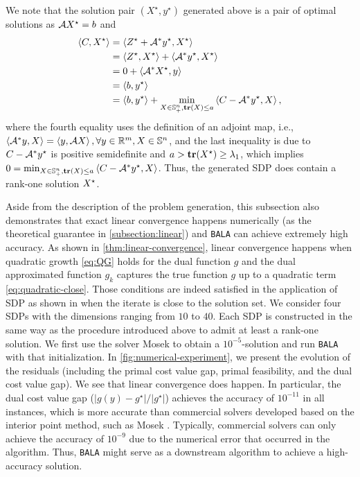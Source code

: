\documentclass[11pt]{article}
\newcommand{\alg}{\texttt{BALA}}%
\begin{document}
We note that the solution pair \( (X^\star, y^\star) \) generated above is a pair of optimal solutions as $\mathcal{A} X^\star = b$ and 
\begin{align*}
    \left \langle C, X^\star \right\rangle & = \left \langle Z^\star + \mathcal{A}^*y^\star, X^\star \right\rangle  \\
    & = \left \langle Z^\star, X^\star \right\rangle + \left \langle \mathcal{A}^*y^\star, X^\star \right\rangle \\
    & = 0 + \left \langle \mathcal{A}^* X^\star,  y \right\rangle \\
    & = \left \langle b, y^\star \right\rangle\\
    &=  \left \langle b, y^\star \right\rangle + \min_{X \in \mathbb{S}^n_+, \mathop{\bf tr}(X) \leq a} \left \langle C-\mathcal{A}^* y^\star, X \right\rangle,
\end{align*}
where the fourth equality uses the definition of an adjoint map, i.e., $\left \langle \mathcal{A}^* y,  X \right\rangle = \left \langle y, \mathcal{A} X \right\rangle, \forall y \in \mathbb{R}^m, X \in \mathbb{S}^n$, and the last inequality is due to $C - \mathcal{A}^* y^\star $ is positive semidefinite and $a > \mathop{\bf tr}(X^\star) \geq \lambda_1$, which implies $0 = \min_{X \in \mathbb{S}^n_+, \mathop{\bf tr}(X) \leq a} \left \langle C-\mathcal{A}^* y^\star, X \right\rangle$. Thus, the generated SDP does contain a rank-one solution $X^\star$. 

Aside from the description of the problem generation, this subsection also demonstrates that exact linear convergence happens numerically (as the theoretical guarantee in \cref{subsection:linear}) and \alg{} can achieve extremely high accuracy. As shown in \cref{thm:linear-convergence}, linear convergence happens when quadratic growth \eqref{eq:QG} holds for the dual function $g$ and the dual approximated function $g_k$ captures the true function $g$ up to a quadratic term \eqref{eq:quadratic-close}. Those conditions are indeed satisfied in the application of SDP as shown in \cite{ding2023revisiting} when the iterate is close to the solution set. We consider four SDPs with the dimensions ranging from $10$ to $40$. Each SDP is constructed in the same way as the procedure introduced above to admit at least a rank-one solution. We first use the solver Mosek \cite{mosek} to obtain a $10^{-5}$-solution and run \alg{} with that initialization. In \cref{fig:numerical-experiment}, we present the evolution of the residuals (including the primal cost value gap, primal feasibility, and the dual cost value gap). We see that linear convergence does happen. In particular, the dual cost value gap ($|g(y) - g^\star|/|g^\star|$) achieves the accuracy of $10^{-11}$ in all instances, which is more accurate than commercial solvers developed based on the interior point method, such as Mosek \cite{mosek}. Typically, commercial solvers can only achieve the accuracy of $10^{-9}$ due to the numerical error that occurred in the algorithm. Thus, \alg{} might serve as a downstream algorithm to achieve a high-accuracy solution.
\end{document}
